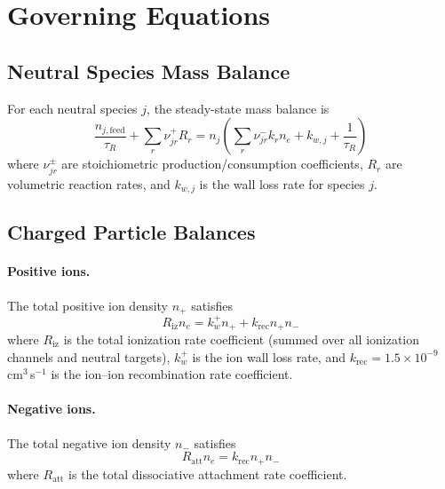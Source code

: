 \documentclass[11pt,a4paper]{article}
\newcommand{\ne}{n_e}
\begin{document}
\section{Governing Equations}

\subsection{Neutral Species Mass Balance}

For each neutral species $j$, the steady-state mass balance is
\begin{equation}
\frac{n_{j,\mathrm{feed}}}{\tau_R} + \sum_r \nu_{jr}^+ R_r = n_j \left( \sum_r \nu_{jr}^- k_r \ne + k_{w,j} + \frac{1}{\tau_R} \right)
\label{eq:neutral_balance}
\end{equation}
where $\nu_{jr}^\pm$ are stoichiometric production/consumption coefficients, $R_r$ are volumetric reaction rates, and $k_{w,j}$ is the wall loss rate for species $j$.

\subsection{Charged Particle Balances}

\paragraph{Positive ions.} The total positive ion density $n_+$ satisfies
\begin{equation}
R_\mathrm{iz} \ne = k_w^+ n_+ + k_\mathrm{rec} n_+ n_-
\label{eq:pos_ion_balance}
\end{equation}
where $R_\mathrm{iz}$ is the total ionization rate coefficient (summed over all ionization channels and neutral targets), $k_w^+$ is the ion wall loss rate, and $k_\mathrm{rec} = 1.5 \times 10^{-9}$\,cm$^3$\,s$^{-1}$ is the ion--ion recombination rate coefficient.

\paragraph{Negative ions.} The total negative ion density $n_-$ satisfies
\begin{equation}
R_\mathrm{att} \ne = k_\mathrm{rec} n_+ n_-
\label{eq:neg_ion_balance}
\end{equation}
where $R_\mathrm{att}$ is the total dissociative attachment rate coefficient.
\end{document}
